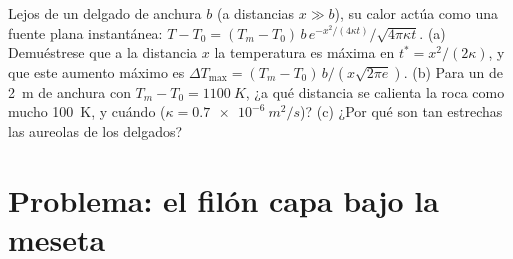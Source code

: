 \begin{exercise}[$\star\star\star$]\label{exo:b2:magma-emplacement:12}
Lejos de un  delgado de anchura $b$ (a distancias $x \gg b$), su calor actúa como una
fuente plana instantánea: $T - T_0 = (T_m - T_0)\,b\,e^{-x^2/(4\kappa
t)}/\sqrt{4\pi\kappa t}$. (a) Demuéstrese que a la distancia $x$ la temperatura es máxima en
$t^* = x^2/(2\kappa)$, y que este aumento máximo es $\Delta T_{\max} = (T_m -
T_0)\,b/(x\sqrt{2\pi e})$. (b) Para un  de \qty{2}{m} de anchura con $T_m - T_0 =
\qty{1100}{K}$, ¿a qué distancia se calienta la roca como mucho \qty{100}{K}, y
cuándo ($\kappa = \qty{0.7e-6}{m^2/s}$)? (c) ¿Por qué son tan estrechas las aureolas de los
 delgados?
\end{exercise}

\section{Problema: el filón capa bajo la meseta}

